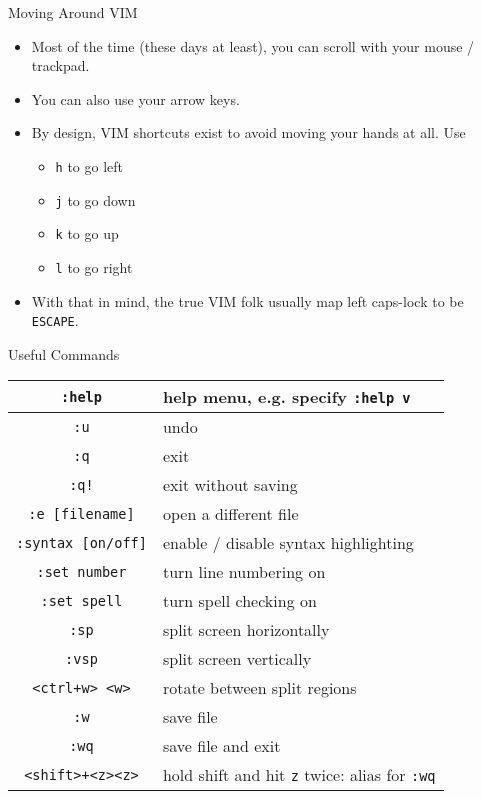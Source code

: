 \begin{frame}[fragile]{Moving Around VIM}
  \begin{itemize}[<+- | alert@+>]
    \item Most of the time (these days at least), you can scroll with your mouse / trackpad.
    \item You can also use your arrow keys.
    \item By design, VIM shortcuts exist to avoid moving your hands at all.  Use
    \begin{itemize}[<+- | alert@+>]
      \item \texttt{h} to go left
      \item \texttt{j} to go down
      \item \texttt{k} to go up
      \item \texttt{l} to go right
    \end{itemize}
    \item With that in mind, the true VIM folk usually map left caps-lock to be \texttt{ESCAPE}.
  \end{itemize}
\end{frame}

\begin{frame}[fragile]{Useful Commands}
  \vspace*{-3ex}
  \begin{center}
    \begin{tabular}{|c|l|}
      \hline
      \texttt{:help} & help menu, e.g. specify \texttt{:help v}\\ \hline
      \texttt{:u} & undo\\ \hline
      \texttt{:q} & exit\\ \hline
      \texttt{:q!} & exit without saving\\ \hline
      \texttt{:e [filename]} & open a different file\\ \hline
      \texttt{:syntax [on/off]} & enable / disable syntax highlighting\\ \hline
      \texttt{:set number} & turn line numbering on\\ \hline
      \texttt{:set spell} & turn spell checking on\\ \hline
      \texttt{:sp} & split screen horizontally\\ \hline
      \texttt{:vsp} & split screen vertically\\ \hline
      \texttt{<ctrl+w> <w>} & rotate between split regions\\ \hline
      \texttt{:w} & save file\\ \hline
      \texttt{:wq} & save file and exit\\ \hline
      \texttt{<shift>+<z><z>} & hold shift and hit \texttt{z} twice: alias for \texttt{:wq}\\ \hline
    \end{tabular}
  \end{center}
\end{frame}

